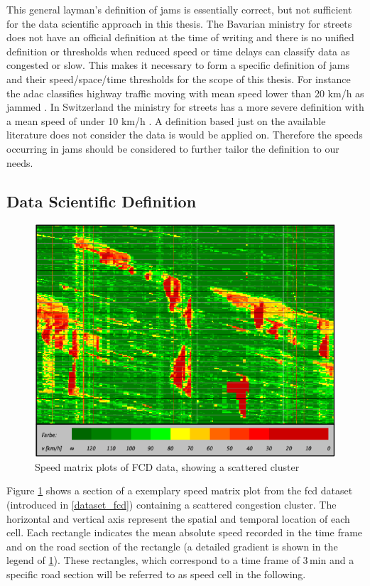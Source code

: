 This general layman's definition of jams is essentially correct, but not sufficient for the data scientific approach in this thesis. The Bavarian ministry for streets does not have an official definition at the time of writing and there is no unified definition or thresholds when reduced speed or time delays can classify data as congested or slow. This makes it necessary to form a specific definition of \glspl{jam} and their speed/space/time thresholds for the scope of this thesis. For instance the \acrshort{adac} classifies highway traffic moving with mean speed lower than 20 km/h as jammed \parencite{ADAC2019}. In Switzerland the ministry for streets has a more severe definition with a mean speed of under 10 km/h \parencite{ASTRA2020}. A definition based just on the available literature does not consider the data is would be applied on. Therefore the speeds occurring in jams should be considered to further tailor the definition to our needs.

\subsection{Data Scientific Definition}

\begin{figure}[ht]
	\centering
	\includegraphics[scale=0.8]{images/SpeedMatrixPlot_single}
	\caption{Speed matrix plots of FCD data, showing a scattered cluster}
	\label{img:speedMatrixPlot_singleCluster}
\end{figure}

Figure \ref{img:speedMatrixPlot_singleCluster} shows a section of a exemplary speed matrix plot from the \acrshort{fcd} dataset (introduced in \cref{dataset_fcd}) containing a scattered congestion cluster. The horizontal and vertical axis represent the spatial and temporal location of each cell. Each rectangle indicates the mean absolute speed recorded in the time frame and on the road section of the rectangle (a detailed gradient is shown in the legend of \cref{img:speedMatrixPlot_singleCluster}). These rectangles, which correspond to a time frame of 3\,min and a specific road section will be referred to as speed cell in the following.


